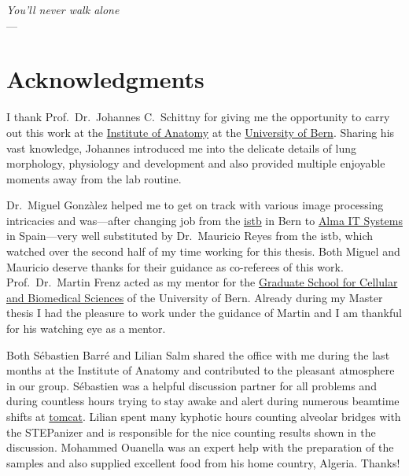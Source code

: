 \acresetall
{}
\begin{flushright}{\slshape You'll never walk alone} \\ \medskip
	---  \citep{Cash}
\end{flushright}
\vspace{6cm}
\begingroup
\let\clearpage\relax
\let\cleardoublepage\relax
\let\cleardoublepage\relax
\chapter*{Acknowledgments}
I thank Prof.\ Dr.\ Johannes C.\ Schittny for giving me the opportunity to carry out this work at the \href{http://www.ana.unibe.ch/}{Institute of Anatomy} at the \href{http://unibe.ch/}{University of Bern}. Sharing his vast knowledge, Johannes introduced me into the delicate details of lung morphology, physiology and development and also provided multiple enjoyable moments away from the lab routine.

Dr.\ Miguel Gonzàlez helped me to get on track with various image processing intricacies and was---after changing job from the \href{http://www.istb.unibe.ch/}{\ac{istb}} in Bern to \href{http://www.alma3d.com/}{Alma IT Systems} in Spain---very well substituted by Dr.\ Mauricio Reyes from the \ac{istb}, which watched over the second half of my time working for this thesis. Both Miguel and Mauricio deserve thanks for their guidance as co-referees of this work. Prof.\ Dr.\ Martin Frenz acted as my mentor for the \href{http://www.gcb.unibe.ch/}{Graduate School for Cellular and Biomedical Sciences} of the University of Bern. Already during my Master thesis I had the pleasure to work under the guidance of Martin and I am thankful for his watching eye as a mentor.

Both Sébastien Barré and Lilian Salm shared the office with me during the last months at the Institute of Anatomy and contributed to the pleasant atmosphere in our group. Sébastien was a helpful discussion partner for all  problems and during countless hours trying to stay awake and alert during numerous beamtime shifts at \href{http://sls.web.psi.ch/view.php/beamlines/tomcat/}{\acs{tomcat}}. Lilian spent many kyphotic hours counting alveolar bridges with the STEPanizer and is responsible for the nice counting results shown in the discussion. Mohammed Ouanella was an expert help with the preparation of the samples and also supplied excellent food from his home country, Algeria. Thanks!

